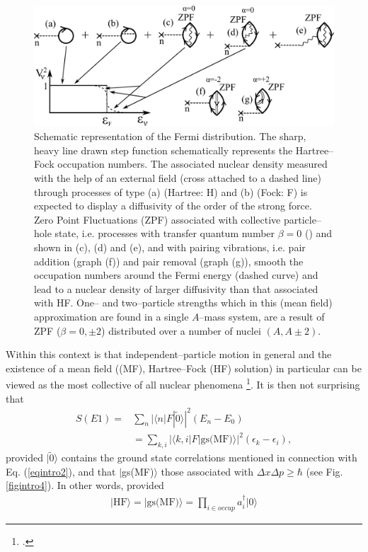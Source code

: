\begin{figure}
\centerline {
\includegraphics*[width=12cm]{introduccion/figs/fig1_2_2}
}
\caption{Schematic representation of the Fermi distribution. The sharp, heavy line drawn step function schematically represents the Hartree--Fock occupation numbers. The associated nuclear density measured with the help of an external field (cross attached to a dashed line) through processes of type (a) (Hartree: H) and (b) (Fock: F) is expected to display a diffusivity of the order of the strong force. Zero Point Fluctuations (ZPF) associated with collective particle--hole state, i.e. processes with transfer quantum number $\beta=0$ (\cite{Bohr:64}) and shown in (c), (d) and (e), and with pairing vibrations, i.e. pair addition (graph (f)) and pair removal (graph (g)), smooth the occupation numbers around the Fermi energy (dashed curve) and lead to a nuclear density of larger diffusivity than that associated with HF. One-- and two--particle strengths which in this (mean field) approximation are found in a single $A$--mass system, are a result of ZPF ($\beta=0,\pm 2$) distributed over a number of nuclei $(A, A\pm 2)$.}
\label{fig1.2.2}
\end{figure}
Within this context is that independent--particle motion in general and the existence of a mean field ((MF), Hartree--Fock (HF) solution) in particular can be viewed as the most collective of all nuclear phenomena \footnote{\cite{Mottelson:62}.}. It is then not surprising that 
\begin{align}\label{eqintro6}
\nonumber S(E1)=&\sum_n |\langle n|F|\tilde 0\rangle|^2(E_n-E_0)\\
&=\sum_{k,i}|\langle k,i|F|\text{gs(MF)}\rangle|^2(\epsilon_{k}-\epsilon_i),
\end{align}
provided $|\tilde 0\rangle$ contains the ground state correlations mentioned in connection with Eq. (\ref{eqintro2}), and that $|$gs(MF)$\rangle$ those associated with $\Delta x\Delta p\geq \hbar$ (see Fig. \ref{figintro4}). In other words, provided
\begin{align}
|\text{HF}\rangle=|\text{gs(MF)}\rangle=\prod_{i\in occup}a^\dagger_i |0\rangle
\end{align}
